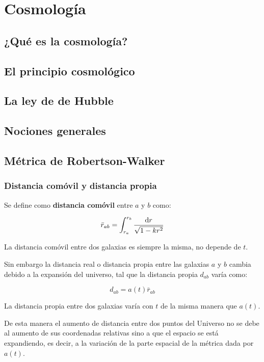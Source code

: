 
\chapter{Cosmología}

\section{¿Qué es la cosmología?}

\section{El principio cosmológico}

\section{La ley de de Hubble}

\section{Nociones generales}

\section{Métrica de Robertson-Walker}
\subsection{Distancia comóvil y distancia propia}


Se define como \textbf{distancia comóvil} entre $a$ y $b$ como: 

\begin{equation}
    \bar{r}_{ab} = \int_{r_a}^{r_b} \frac{\mathrm{d} r}{\sqrt{1-kr^2}} 
\end{equation}
\begin{Anotacion}
    La distancia comóvil entre dos galaxias es siempre la misma, no depende de $t$.
\end{Anotacion}
Sin embargo la distancia real o distancia propia entre las galaxias $a$ y $b$ cambia debido a la expansión del universo, tal que la distancia propia $d_{ab}$ varía como:

\begin{equation}
    d_{ab} = a(t) \bar{r}_{ab}
\end{equation}
\begin{Anotacion}
    La distancia propia entre dos galaxias varía con $t$ de la misma manera que $a(t)$.
\end{Anotacion}
De esta manera el aumento de distancia entre dos puntos del Universo no se debe al aumento de sus coordenadas relativas sino a que el espacio se está expandiendo, es decir, a la variación de la parte espacial de la métrica dada por $a(t)$.

